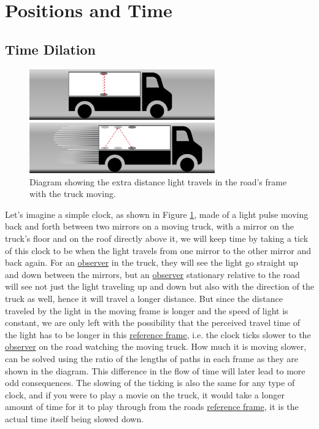 \section{Positions and Time}

\subsection{Time Dilation}

\begin{figure}[H]
	\centering
	\includegraphics[width=8cm]{images/pdf/lorry_clock.pdf}
	\caption{Diagram showing the extra distance light travels in the road's frame with the truck moving.}
	\label{fig: truck clock}
\end{figure}

Let's imagine a simple clock, as shown in Figure \ref{fig: truck clock}, made of a light pulse moving back and forth between two mirrors on a moving truck, with a mirror on the truck's floor and on the roof directly above it, we will keep time by taking a tick of this clock to be when the light travels from one mirror to the other mirror and back again. For an \hyperlink{def-observer}{observer} in the truck, they will see the light go straight up and down between the mirrors, but an \hyperlink{def-observer}{observer} stationary relative to the road will see not just the light traveling up and down but also with the direction of the truck as well, hence it will travel a longer distance. But since the distance traveled by the light in the moving frame is longer and the speed of light is constant, we are only left with the possibility that the perceived travel time of the light has to be longer in this \hyperlink{def-Reference-frame}{reference frame}, i.e. the clock ticks slower to the \hyperlink{def-observer}{observer} on the road watching the moving truck. How much it is moving slower, can be solved using the ratio of the lengths of paths in each frame as they are shown in the diagram. This difference in the flow of time will later lead to more odd consequences. The slowing of the ticking is also the same for any type of clock, and if you were to play a movie on the truck, it would take a longer amount of time for it to play through from the roads \hyperlink{def-Reference-frame}{reference frame}, it is the actual time itself being slowed down.

